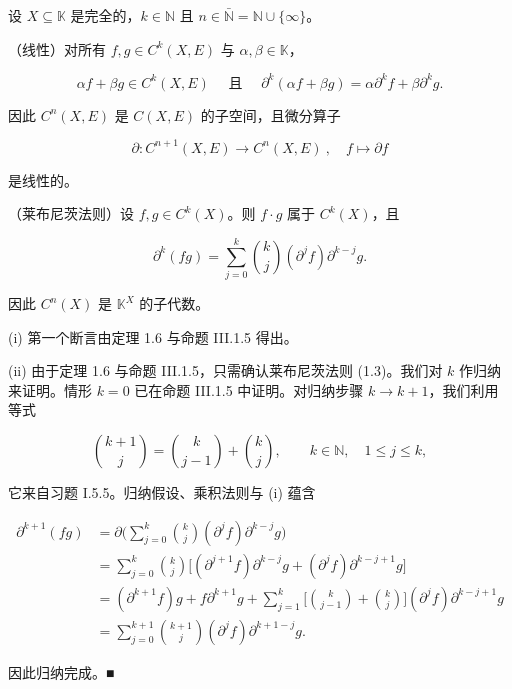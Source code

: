 \begin{theorem}

设 $ X \subseteq \mathbb{K} $ 是完全的，$ k \in \mathbb{N} $ 且 $ n \in \bar{\mathbb{N}} = \mathbb{N} \cup \{\infty\} $。

\begin{subitems}
\item

（线性）对所有 $ f, g \in C^k(X, E) $ 与 $ \alpha, \beta \in \mathbb{K} $，

\[
\alpha f+\beta g\in C^{k}(X,E)\quad\text{ 且 }\quad\partial^{k}(\alpha f+\beta g)=\alpha\partial^{k}f+\beta\partial^{k}g.
\]

因此 $C^{n}(X,E)$ 是 $C(X,E)$ 的子空间，且微分算子

\[
\partial:C^{n+1}(X,E)\to C^{n}(X,E)~,\quad f\mapsto\partial f
\]

是线性的。

\item

（莱布尼茨法则）设 $ f, g \in C^k(X) $。则 $ f \cdot g $ 属于 $ C^k(X) $，且

\begin{equation}
\partial^{k}(f g)=\sum_{j=0}^{k}\binom{k}{j}(\partial^{j}f)\partial^{k-j}g.
\end{equation}

因此 $ C^n(X) $ 是 $ \mathbb{K}^X $ 的子代数。

\proofhead
(i) 第一个断言由定理 1.6 与命题 III.1.5 得出。
\end{subitems}

(ii) 由于定理 1.6 与命题 III.1.5，只需确认莱布尼茨法则 (1.3)。我们对 $k$ 作归纳来证明。情形 $k=0$ 已在命题 III.1.5 中证明。对归纳步骤 $ k \to k + 1 $，我们利用等式

\[
\binom{k+1}{j}=\binom{k}{j-1}+\binom{k}{j},\qquad k\in\mathbb{N},\quad1\leq j\leq k,
\]

它来自习题 I.5.5。归纳假设、乘积法则与 (i) 蕴含

\begin{equation*}
\begin{aligned}
\partial^{k+1}(fg)&=\partial\Big(\sum_{j=0}^{k}\binom{k}{j}(\partial^{j} f)\partial^{k-j}g\Big)\\&=\sum_{j=0}^{k}\binom{k}{j}\big[(\partial^{j+1}f)\partial^{k-j}g+(\partial^{j} f)\partial^{k-j+1}g\big]\\&=(\partial^{k+1}f)g+f\partial^{k+1}g+\sum_{j=1}^{k}\Big[\binom{k}{j-1}+\binom{k}{j}\Big](\partial^{j} f)\partial^{k-j+1}g\\&=\sum_{j=0}^{k+1}\binom{k+1}{j}(\partial^{j} f)\partial^{k+1-j}g.
\end{aligned}
\end{equation*}

因此归纳完成。■

\end{theorem}

